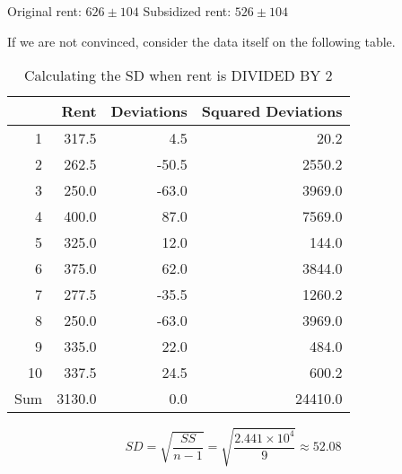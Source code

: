 \documentclass[11pt]{book}\usepackage[]{graphicx}\usepackage[]{color}
\begin{document}
\begin{center}
Original rent: $ 626 \pm 104 $ \hspace{2cm} Subsidized rent: $ 526 \pm 104 $
\end{center}

If we are not convinced, consider the data itself on the following table.



\begin{table}[ht]
\centering
\begin{tabular}{rrrr}
  \hline
 & Rent & Deviations & Squared Deviations \\ 
  \hline
1 & 317.5 & 4.5 & 20.2 \\ 
  2 & 262.5 & -50.5 & 2550.2 \\ 
  3 & 250.0 & -63.0 & 3969.0 \\ 
  4 & 400.0 & 87.0 & 7569.0 \\ 
  5 & 325.0 & 12.0 & 144.0 \\ 
  6 & 375.0 & 62.0 & 3844.0 \\ 
  7 & 277.5 & -35.5 & 1260.2 \\ 
  8 & 250.0 & -63.0 & 3969.0 \\ 
  9 & 335.0 & 22.0 & 484.0 \\ 
  10 & 337.5 & 24.5 & 600.2 \\ 
  Sum & 3130.0 & 0.0 & 24410.0 \\ 
   \hline
\end{tabular}
\caption{Calculating the SD when rent is DIVIDED BY 2} 
\end{table}


$$ SD = \sqrt{ \frac{ SS}{n - 1}} = \sqrt{ \frac{ \ensuremath{2.441\times 10^{4}}}{9}} \approx 52.08 $$

\newpage

\end{document}
